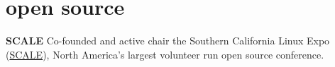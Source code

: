 \section{open source}

\textbf{SCALE}
\newline
\vspace{\parsep}
\newline Co-founded and active chair the Southern California Linux Expo (\href{https://socallinuxexpo.org}{SCALE}), North America's largest volunteer run open source conference. 
\vspace{\parsep}
